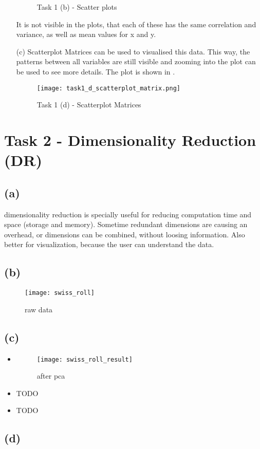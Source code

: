 \documentclass[a4paper]{article}
\begin{document}
\begin{enumerate}
\begin{figure}[!ht]
		
		
		\caption{Task 1 (b) - Scatter plots}
		\label{scatterplots}
	\end{figure}
	
	It is not visible in the plots, that each of these has the same correlation and variance, as well as mean values for x and y. 
	
	\item[(c)] Scatterplot Matrices can be used to visualised this data. 
	This way, the patterns between all variables are still visible and zooming into the plot can be used to see more details. 
	The plot is shown in .
	\begin{figure}[!ht]
		\texttt{[image: task1\_d\_scatterplot\_matrix.png]}
		
		\caption{Task 1 (d) - Scatterplot Matrices }
		\label{scatterplots_d}
	\end{figure}
	
\end{enumerate}

\newpage
\section*{Task 2 - Dimensionality Reduction (DR)}

\subsection*{(a)}
dimensionality reduction is specially useful for reducing computation time and space (storage and memory). Sometime redundant dimensions are causing an overhead, or dimensions can be combined, without loosing information. Also better for visualization, because the user can understand the data.

\subsection*{(b)}
\begin{figure}[!ht]
	\centering
	\texttt{[image: swiss\_roll]}
	\caption{raw data}
\end{figure}

\subsection*{(c)}
\begin{itemize}
	\item \begin{figure}[!ht]
		\centering
		\texttt{[image: swiss\_roll\_result]}
		\caption{after pca}
	\end{figure}
	\item TODO
	\item TODO
\end{itemize}


\subsection*{(d)}
\end{document}
